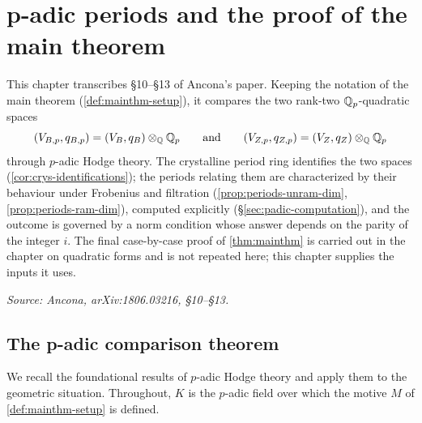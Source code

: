 \chapter{p-adic periods and the proof of the main theorem}

\providecommand{\REP}{\mathrm{Rep}}
\providecommand{\SO}{\mathrm{SO}}

This chapter transcribes \S10--\S13 of Ancona's paper. Keeping the notation of
the main theorem (\cref{def:mainthm-setup}), it compares the two rank-two
\(\mathbb{Q}_p\)-quadratic spaces
\[(V_{B,p}, q_{B,p}) = (V_B, q_B) \otimes_{\mathbb{Q}} \mathbb{Q}_p \qquad \text{and} \qquad
  (V_{Z,p}, q_{Z,p}) = (V_Z, q_Z) \otimes_{\mathbb{Q}} \mathbb{Q}_p\]
through \(p\)-adic Hodge theory. The crystalline period ring identifies the two
spaces (\cref{cor:crys-identifications}); the periods relating them are
characterized by their behaviour under Frobenius and filtration
(\cref{prop:periods-unram-dim}, \cref{prop:periods-ram-dim}), computed
explicitly (\S\ref{sec:padic-computation}), and the outcome is governed by a
norm condition whose answer depends on the parity of the integer \(i\). The
final case-by-case proof of \cref{thm:mainthm} is carried out in the chapter on
quadratic forms and is not repeated here; this chapter supplies the inputs it
uses.

\textit{Source: Ancona, arXiv:1806.03216, \S10--\S13.}

\section{The p-adic comparison theorem}

We recall the foundational results of \(p\)-adic Hodge theory and apply them to
the geometric situation. Throughout, \(K\) is the \(p\)-adic field over which the
motive \(M\) of \cref{def:mainthm-setup} is defined.

